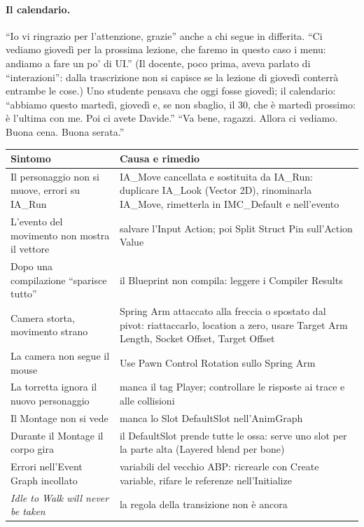 \paragraph{Il calendario.} ``Io vi ringrazio per l'attenzione, grazie'' anche a chi segue
in differita. ``Ci vediamo giovedì per la prossima lezione, che faremo in questo caso i
menu: andiamo a fare un po' di UI.'' (Il docente, poco prima, aveva parlato di
``interazioni'': dalla trascrizione non si capisce se la lezione di giovedì conterrà
entrambe le cose.) Uno studente pensava che oggi fosse giovedì; il calendario: ``abbiamo
questo martedì, giovedì e, se non sbaglio, il 30, che è martedì prossimo: è l'ultima con
me. Poi ci avete Davide.'' ``Va bene, ragazzi. Allora ci vediamo. Buona cena. Buona
serata.''

\begin{table}[htbp]
\centering
\small
\begin{tabular}{@{}p{5.4cm}p{8.6cm}@{}}
\toprule
\textbf{Sintomo} & \textbf{Causa e rimedio} \\
\midrule
Il personaggio non si muove, errori su IA\_Run & IA\_Move cancellata e sostituita da
IA\_Run: duplicare IA\_Look (Vector 2D), rinominarla IA\_Move, rimetterla in IMC\_Default
e nell'evento \\
L'evento del movimento non mostra il vettore & salvare l'Input Action; poi Split Struct
Pin sull'Action Value \\
Dopo una compilazione ``sparisce tutto'' & il Blueprint non compila: leggere i Compiler
Results \\
Camera storta, movimento strano & Spring Arm attaccato alla freccia o spostato dal pivot:
riattaccarlo, location a zero, usare Target Arm Length, Socket Offset, Target Offset \\
La camera non segue il mouse & Use Pawn Control Rotation sullo Spring Arm \\
La torretta ignora il nuovo personaggio & manca il tag Player; controllare le risposte
ai trace e alle collisioni \\
Il Montage non si vede & manca lo Slot DefaultSlot nell'AnimGraph \\
Durante il Montage il corpo gira & il DefaultSlot prende tutte le ossa: serve uno slot
per la parte alta (Layered blend per bone) \\
Errori nell'Event Graph incollato & variabili del vecchio ABP: ricrearle con Create
variable, rifare le referenze nell'Initialize \\
\emph{Idle to Walk will never be taken} & la regola della transizione non è ancora

\end{tabular}
\end{table}
